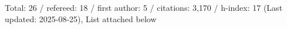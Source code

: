 Total: 26 / refereed: 18 / first author: 5 / citations: 3,170 / h-index: 17 (Last updated: 2025-08-25), List attached below